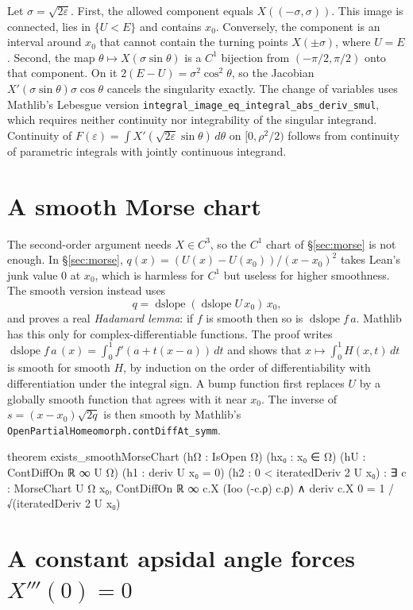 \documentclass[11pt]{article}
\theoremstyle{remark}
\begin{document}
Let $\sigma=\sqrt{2\varepsilon}$. First, the allowed component equals $X((-\sigma,\sigma))$. This
image is connected, lies in $\{U<E\}$ and contains $x_0$. Conversely, the component is an interval
around $x_0$ that cannot contain the turning points $X(\pm\sigma)$, where $U=E$. Second, the map
$\theta\mapsto X(\sigma\sin\theta)$ is a $C^1$ bijection from $(-\pi/2,\pi/2)$ onto that
component. On it $2(E-U)=\sigma^2\cos^2\theta$, so the Jacobian $X'(\sigma\sin\theta)\sigma\cos\theta$
cancels the singularity exactly. The change of variables uses Mathlib's Lebesgue version
\texttt{integral\_image\_eq\_integral\_abs\_deriv\_smul}, which requires neither continuity nor
integrability of the singular integrand. Continuity of
$F(\varepsilon)=\int X'(\sqrt{2\varepsilon}\sin\theta)\,d\theta$ on $[0,\rho^2/2)$ follows from
continuity of parametric integrals with jointly continuous integrand.

\section{A smooth Morse chart}\label{sec:smooth}

The second-order argument needs $X\in C^3$, so the $C^1$ chart of \S\ref{sec:morse} is not
enough. In \S\ref{sec:morse}, $q(x)=(U(x)-U(x_0))/(x-x_0)^2$ takes Lean's junk value $0$ at $x_0$,
which is harmless for $C^1$ but useless for higher smoothness. The smooth version instead uses
\[
  q=\operatorname{dslope}(\operatorname{dslope}U\,x_0)\,x_0,
\]
and proves a real \emph{Hadamard lemma}: if $f$ is smooth then so is
$\operatorname{dslope}f\,a$. Mathlib has this only for complex-differentiable functions. The proof
writes $\operatorname{dslope}f\,a\,(x)=\int_0^1f'(a+t(x-a))\,dt$ and shows that
$x\mapsto\int_0^1H(x,t)\,dt$ is smooth for smooth $H$, by induction on the order of
differentiability with differentiation under the integral sign. A bump function first replaces $U$
by a globally smooth function that agrees with it near $x_0$. The inverse of
$s=(x-x_0)\sqrt{2q}$ is then smooth by Mathlib's \texttt{OpenPartialHomeomorph.contDiffAt\_symm}.

\begin{lean}
theorem exists_smoothMorseChart (hΩ : IsOpen Ω) (hx₀ : x₀ ∈ Ω)
    (hU : ContDiffOn ℝ ∞ U Ω) (h1 : deriv U x₀ = 0) (h2 : 0 < iteratedDeriv 2 U x₀) :
    ∃ c : MorseChart U Ω x₀, ContDiffOn ℝ ∞ c.X (Ioo (-c.ρ) c.ρ) ∧
      deriv c.X 0 = 1 / √(iteratedDeriv 2 U x₀)
\end{lean}

\section{A constant apsidal angle forces $X'''(0)=0$}\label{sec:second}
\end{document}
